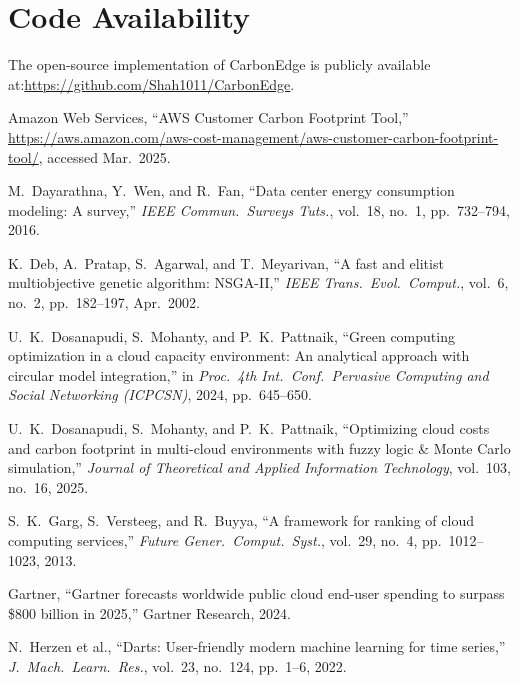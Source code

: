 \documentclass[12pt]{article}
\begin{document}
\section*{Code Availability}

The open-source implementation of CarbonEdge is publicly available at:\url{https://github.com/Shah1011/CarbonEdge}.

\begin{thebibliography}{}

 Amazon Web Services, ``AWS Customer Carbon Footprint Tool,'' \url{https://aws.amazon.com/aws-cost-management/aws-customer-carbon-footprint-tool/}, accessed Mar.\ 2025.

 M.~Dayarathna, Y.~Wen, and R.~Fan, ``Data center energy consumption modeling: A survey,'' \textit{IEEE Commun.\ Surveys Tuts.}, vol.\ 18, no.\ 1, pp.\ 732--794, 2016.

 K.~Deb, A.~Pratap, S.~Agarwal, and T.~Meyarivan, ``A fast and elitist multiobjective genetic algorithm: NSGA-II,'' \textit{IEEE Trans.\ Evol.\ Comput.}, vol.\ 6, no.\ 2, pp.\ 182--197, Apr.\ 2002.

 U.~K.~Dosanapudi, S.~Mohanty, and P.~K.~Pattnaik, ``Green computing optimization in a cloud capacity environment: An analytical approach with circular model integration,'' in \textit{Proc.\ 4th Int.\ Conf.\ Pervasive Computing and Social Networking (ICPCSN)}, 2024, pp.\ 645--650.

 U.~K.~Dosanapudi, S.~Mohanty, and P.~K.~Pattnaik, ``Optimizing cloud costs and carbon footprint in multi-cloud environments with fuzzy logic \& Monte Carlo simulation,'' \textit{Journal of Theoretical and Applied Information Technology}, vol.\ 103, no.\ 16, 2025.

 S.~K.~Garg, S.~Versteeg, and R.~Buyya, ``A framework for ranking of cloud computing services,'' \textit{Future Gener.\ Comput.\ Syst.}, vol.\ 29, no.\ 4, pp.\ 1012--1023, 2013.

 Gartner, ``Gartner forecasts worldwide public cloud end-user spending to surpass \$800 billion in 2025,'' Gartner Research, 2024.

 N.~Herzen et al., ``Darts: User-friendly modern machine learning for time series,'' \textit{J.\ Mach.\ Learn.\ Res.}, vol.\ 23, no.\ 124, pp.\ 1--6, 2022.


\end{thebibliography}
\end{document}
